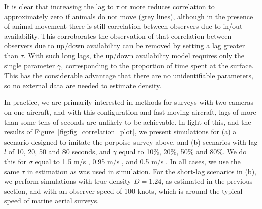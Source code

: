 \documentclass[useAMS, usenatbib, referee]{biom}\usepackage[]{graphicx}\usepackage[]{color}
\begin{document}
It is clear that increasing the lag to $\tau$ or more reduces correlation to approximately zero if animals do not move (grey lines), although in the presence of animal movement there is still correlation between observers due to in/out availability. This corroborates the observation of \cite{Stevenson+al:18} that correlation between observers due to up/down availability can be removed by setting a lag greater than $\tau$. With such long lags, the up/down availability model requires only the single parameter $\gamma$, corresponding to the proportion of time spent at the surface. This has the considerable advantage that there are no unidentifiable parameters, so no external data are needed to estimate density.



In practice, we are primarily interested in methods for surveys with two cameras on one aircraft, and with this configuration and fast-moving aircraft, lags of more than some tens of seconds are unlikely to be achievable. In light of this, and the results of Figure~\ref{fig:fig_correlation_plot}, we present simulations for (a) a scenario designed to imitate the porpoise survey above, and (b) scenarios with lag $l$ of 10, 20, 50 and 80 seconds, and $\gamma$ equal to 10\%, 20\%, 50\% and 80\%. We do this for $\sigma$ equal to 1.5 m/s \citep[the speed estimated by][]{Hiby+Lovell:98}, 0.95 m/s \citep[the speed estimated by][]{Westgate+al:95}, and 0.5 m/s \citep[a speed lower than that estimated above or by][]{Stevenson+al:18}. In all cases, we use the same $\tau$ in estimation as was used in simulation. For the short-lag scenarios in (b), we perform simulations with true density $D=1.24$, as estimated in the previous section, and with an observer speed of 100 knots, which is around the typical speed of marine aerial surveys.
\end{document}
